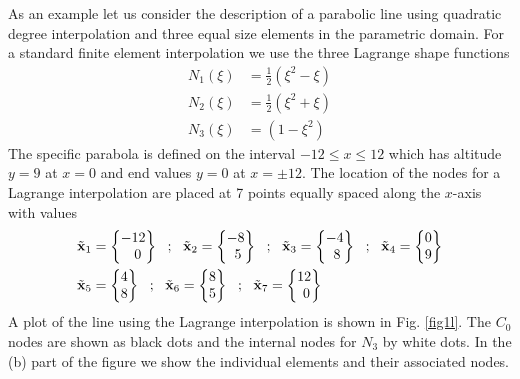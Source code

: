 As an example let us consider the description of a parabolic line
using quadratic degree interpolation and three equal size elements in
the parametric domain.  For a standard finite element interpolation we
use the three Lagrange shape functions
\begin{displaymath}
\begin{split}
N_1(\xi) &= \tfrac{1}{2} (\xi^2 - \xi ) \\
N_2(\xi) &= \tfrac{1}{2} (\xi^2 + \xi ) \\
N_3(\xi) &= (1 - \xi^2)
\end{split}
\end{displaymath}
The specific parabola is defined
on the interval $-12 \le x \le 12$ which has altitude $y = 9$ at $x=0$ 
and end values $y = 0$ at $x = \pm 12$.
The location of the nodes for a Lagrange interpolation are placed at
7 points equally spaced along the $x$-axis with values
\begin{displaymath}
\begin{split}
\tilde{\mathbf{x}}_1 &= \begin{Bmatrix} -12 \\ ~~0 \end{Bmatrix}  ~~;~~
\tilde{\mathbf{x}}_2 = \begin{Bmatrix} -8 \\ ~5 \end{Bmatrix}  ~~;~~
\tilde{\mathbf{x}}_3 = \begin{Bmatrix} -4 \\ ~8 \end{Bmatrix}  ~~;~~
\tilde{\mathbf{x}}_4 = \begin{Bmatrix} 0 \\ 9 \end{Bmatrix}  \\
\tilde{\mathbf{x}}_5 &= \begin{Bmatrix} 4 \\ 8 \end{Bmatrix}  ~~;~~
\tilde{\mathbf{x}}_6 = \begin{Bmatrix} 8 \\ 5 \end{Bmatrix}  ~~;~~
\tilde{\mathbf{x}}_7 = \begin{Bmatrix} 12 \\ ~0 \end{Bmatrix}
\end{split}
\end{displaymath}
A plot of the line using the Lagrange interpolation is shown in Fig.
\ref{fig1l}.  The $C_0$ nodes are shown as black dots and the
internal nodes for $N_3$ by white dots.
In the (b) part of the figure we show the individual elements and
their associated nodes.

